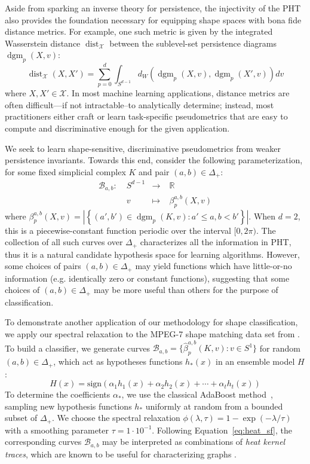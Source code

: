 \documentclass[pdflatex,sn-mathphys-num]{sn-jnl}
\begin{document}
Aside from sparking an inverse theory for persistence, the injectivity of the PHT also provides the foundation necessary for equipping shape spaces with bona fide distance metrics. For example, one such metric is given by the integrated Wasserstein distance \(\operatorname{dist}_{\mathcal{X}}\) between the sublevel-set persistence diagrams \(\operatorname{dgm}_{p}(X,v)\):
\[
\operatorname{dist}_{\mathcal{X}}(X,X') = \sum_{p = 0}^{d}\int_{S^{d - 1}}d_{W}\left( \operatorname{dgm}_{p}(X,v),\operatorname{dgm}_{p}(X',v) \right)dv
\]
\noindent where \(X,X' \in \mathcal{X}\). In most machine learning applications, distance metrics are often difficult---if not intractable--to analytically determine; instead, most practitioners either craft or learn task-specific pseudometrics that are easy to compute and discriminative enough for the given application.

We seek to learn shape-sensitive, discriminative pseudometrics from weaker persistence invariants. Towards this end, consider the following parameterization, for some fixed simplicial complex \(K\) and pair \((a,b) \in \Delta_{+}\):
\[
\begin{aligned}
\mathcal{B}_{a,b}: & \; S^{d - 1} & \rightarrow & \; \mathbb{R} \\
 & \; v & \mapsto & \; \beta_{p}^{a,b}(X,v)
\end{aligned}
\] 
\noindent where \(\beta_{p}^{a,b}(X,v) = \left| \left\{ (a',b') \in \operatorname{dgm}_{p}(K,v):a' \leq a,b < b' \right\} \right|\). When \(d = 2\), this is a piecewise-constant function periodic over the interval \(\lbrack 0,2\pi)\). The collection of all such curves over \(\Delta_{+}\) characterizes all the information in PHT, thus it is a natural candidate hypothesis space for learning algorithms. However, some choices of pairs \((a,b) \in \Delta_{+}\) may yield functions which have little-or-no information (e.g. identically zero or constant functions), suggesting that some choices of \((a,b) \in \Delta_{+}\) may be more useful than others for the purpose of classification.

To demonstrate another application of our methodology for shape classification, we apply our spectral relaxation to the MPEG-7 shape matching data set from \cite{bai2009learning}. To build a classifier, we generate curves \(\mathcal{B}_{a,b} = \{ {\hat{\beta}}_{p}^{a,b}(K,v) : v \in S^{1} \}\) for random  \((a,b) \in \Delta_{+}\), which act as hypotheses functions \(h_{\ast}(x)\) in an ensemble model \(H\):
\[
	H(x) = \mathrm{sign}\left( \alpha_{1}h_{1}(x) + \alpha_{2}h_{2}(x) + \cdots + \alpha_{t}h_{t}(x) \right)
\]
\noindent
To determine the coefficients \(\alpha_{\ast}\), we use the classical AdaBoost method~\cite{mukherjee2013rate}, sampling new hypothesis functions \(h_{\ast}\) uniformly at random from a bounded subset of \(\Delta_{+}\). We choose the spectral relaxation \(\phi(\lambda,\tau) = 1 - \exp( - \lambda/\tau)\) with a smoothing parameter \(\tau = 1 \cdot 10^{- 1}\). Following Equation~\ref{eq:heat_sf}, the corresponding curves \(\mathcal{B}_{a,b}\) may be interpreted as combinations of \emph{heat kernel traces}, which are known to be useful for characterizing graphs \cite{xiao2009graph}.
\end{document}

